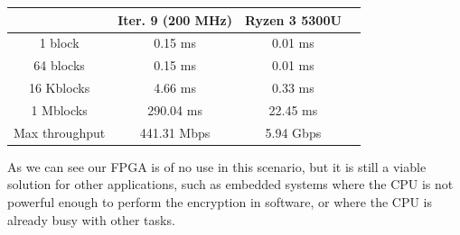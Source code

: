 \documentclass[12pt,oneside,a4paper]{article}
\begin{document}
\begin{table}[h!]
	\centering
	\begin{tabular}{cccc}
		\toprule
		 & Iter. 9 (200 MHz) & Ryzen 3 5300U \\
		\midrule
		1 block & 0.15 ms & 0.01 ms \\
		64 blocks & 0.15 ms & 0.01 ms \\
		16 Kblocks & 4.66 ms & 0.33 ms \\
		1 Mblocks & 290.04 ms & 22.45 ms \\
		Max throughput & 441.31 Mbps & 5.94 Gbps \\
		\bottomrule
	\end{tabular}
\end{table}

As we can see our FPGA is of no use in this scenario, but it is still a viable solution for other applications, such as embedded systems where the CPU is not powerful enough to perform the encryption in software, or where the CPU is already busy with other tasks.

\printbibliography
\end{document}
